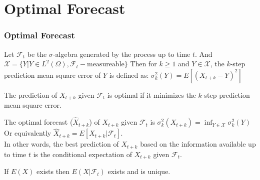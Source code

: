 \documentclass{beamer}
\begin{document}
\section{Optimal Forecast}
\begin{frame}
    \frametitle{Optimal Forecast}
    \begin{definition}
        Let $\mathcal{F}_t$ be the $\sigma$-algebra generated by the process up to time $t$. And $\mathscr{X} = \{Y | Y \in L^2(\Omega), \mathcal{F}_t - \text{measureable}\}$ 
        Then for $k \geq 1$ and $Y \in \mathscr{X}$, the $k$-step prediction mean square error of $Y$ is defined as:
        $\sigma^2_k(Y) = E[(X_{t+k} - Y)^2]$
    \end{definition}
    The prediction of $X_{t+k}$ given $\mathcal{F}_t$ is optimal if it minimizes the $k$-step prediction mean square error. 
    \begin{theorem}
        The optimal forecast ($\hat{X}_{t+k}$) of $X_{t+k}$ given $\mathcal{F}_t$ is $\sigma^2_k(X_{t+k}) = \inf_{Y \in \mathscr{X}} \sigma^2_k(Y)$\\
        Or equivalently $\hat{X}_{t+k} = E[X_{t+k} | \mathcal{F}_t]$.\\
        In other words, the best prediction of $X_{t+k}$ based on the information available up to time $t$ is the conditional expectation of $X_{t+k}$ given $\mathcal{F}_t$.
    \end{theorem}
    \begin{theorem}
        If $E(X)$ exists then $E(X | \mathcal{F}_t)$ exists and is unique.
    \end{theorem}
\end{frame}
\end{document}
